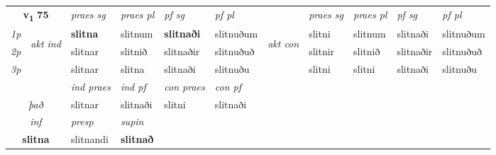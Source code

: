\noindent
\begin{tabular}{lllllllllll} \toprule
\multicolumn{2}{c}{\textbf{v{\textsubscript{1}}} \Large{\textbf{75}}}  &  \textit{praes sg}  & \textit{praes pl}  &\textit{ pf sg} & \textit{pf pl} &  &  \textit{praes sg}  & \textit{praes pl}  & \textit{pf sg} & \textit{pf pl } \\*
	\cmidrule{3-6} \cmidrule{8-11}
 {\textit{1p}} & \multirow{3}{*}{\begin{turn}{90}\textit{akt ind}\end{turn}} & \textbf{slitna} & slitnum & \textbf{slitnaði} & slitnuðum & \multirow{3}{*}{\begin{turn}{90}\textit{akt con}\end{turn}} &slitni & slitnum & slitnaði & slitnuðum\\*
 {\textit{2p}} &  &  slitnar  & slitnið & slitnaðir & slitnuðuð & & slitnir & slitnið & slitnaðir & slitnuðuð \\*
{\textit{3p}} &  & slitnar & slitna & slitnaði & slitnuðu & & slitni & slitni& slitnaði & slitnuðu \\*
\cmidrule{3-6} \cmidrule{8-11}

   & &  \textit{ind praes} & \textit{ind pf} & \textit{con praes} & \textit{con pf} \\*
\multicolumn{2}{c}{ \textit{það} } & slitnar & slitnaði & slitni & slitnaði \\*

\cmidrule{3-4}
   \multicolumn{2}{c}{\textit{inf}}     & \textit{presp} & \textit{supin}   \\*
  \multicolumn{2}{c}{\textbf{slitna}}      & slitnandi &  \textbf{slitnað}   \\*
\end{tabular}

